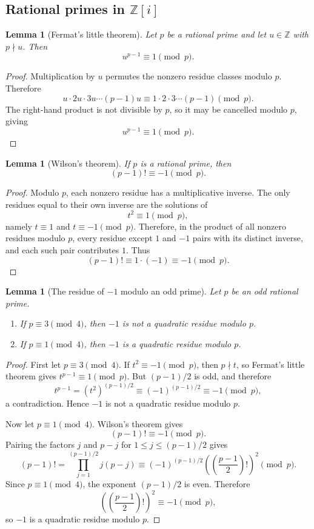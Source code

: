 \documentclass[11pt]{article}
\newtheorem{lemma}[theorem]{Lemma}
\theoremstyle{definition}
\theoremstyle{remark}
\newcommand{\Z}{\mathbb Z}
\newcommand{\Zi}{\mathbb Z[i]}
\begin{document}
\subsection{\texorpdfstring{Rational primes in $\Zi$}{Rational primes in Z[i]}}

\begin{lemma}[Fermat's little theorem]
Let $p$ be a rational prime and let $u\in\Z$ with $p\nmid u$.  Then
\[
        u^{p-1}\equiv1\pmod p.
\]
\end{lemma}

\begin{proof}
Multiplication by $u$ permutes the nonzero residue classes modulo $p$.  Therefore
\[
        u\cdot 2u\cdot 3u\cdots (p-1)u
        \equiv
        1\cdot2\cdot3\cdots(p-1)
        \pmod p.
\]
The right-hand product is not divisible by $p$, so it may be cancelled modulo $p$, giving
\[
        u^{p-1}\equiv1\pmod p.
\]
\end{proof}

\begin{lemma}[Wilson's theorem]
If $p$ is a rational prime, then
\[
        (p-1)!\equiv-1\pmod p.
\]
\end{lemma}

\begin{proof}
Modulo $p$, each nonzero residue has a multiplicative inverse.  The only residues equal to their own inverse are the solutions of
\[
        t^2\equiv1\pmod p,
\]
namely $t\equiv1$ and $t\equiv-1\pmod p$.  Therefore, in the product of all nonzero residues modulo $p$, every residue except $1$ and $-1$ pairs with its distinct inverse, and each such pair contributes $1$.  Thus
\[
        (p-1)!\equiv 1\cdot(-1)\equiv-1\pmod p.
\]
\end{proof}

\begin{lemma}[The residue of $-1$ modulo an odd prime]
Let $p$ be an odd rational prime.
\begin{enumerate}
\item If $p\equiv3\pmod4$, then $-1$ is not a quadratic residue modulo $p$.
\item If $p\equiv1\pmod4$, then $-1$ is a quadratic residue modulo $p$.
\end{enumerate}
\end{lemma}

\begin{proof}
First let $p\equiv3\pmod4$.  If $t^2\equiv-1\pmod p$, then $p\nmid t$, so Fermat's little theorem gives $t^{p-1}\equiv1\pmod p$.  But $(p-1)/2$ is odd, and therefore
\[
        t^{p-1}=(t^2)^{(p-1)/2}\equiv(-1)^{(p-1)/2}\equiv-1\pmod p,
\]
a contradiction.  Hence $-1$ is not a quadratic residue modulo $p$.

Now let $p\equiv1\pmod4$.  Wilson's theorem gives
\[
        (p-1)!\equiv-1\pmod p.
\]
Pairing the factors $j$ and $p-j$ for $1\le j\le (p-1)/2$ gives
\[
        (p-1)!
        =\prod_{j=1}^{(p-1)/2}j(p-j)
        \equiv
        (-1)^{(p-1)/2}\left(\left(\frac{p-1}{2}\right)!\right)^2
        \pmod p.
\]
Since $p\equiv1\pmod4$, the exponent $(p-1)/2$ is even.  Therefore
\[
        \left(\left(\frac{p-1}{2}\right)!\right)^2\equiv-1\pmod p,
\]
so $-1$ is a quadratic residue modulo $p$.
\end{proof}
\end{document}
